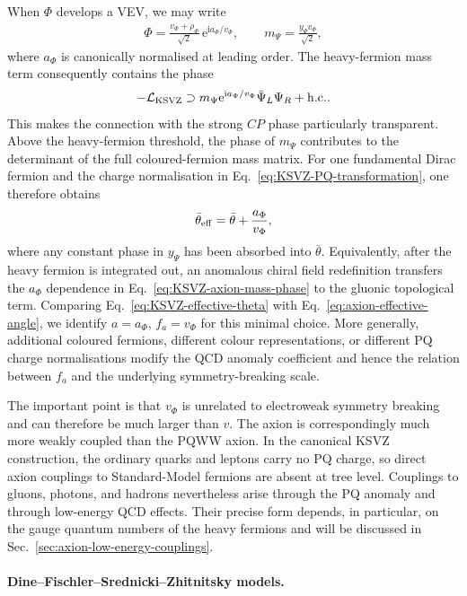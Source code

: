 \documentclass[review]{elsarticle}
\numberwithin{equation}{section}
\numberwithin{table}{section}
\numberwithin{figure}{section}
\def\i{\mathrm{i}}
\def\e{\mathrm{e}}
\def\hc{{\rm h.c.}}
\begin{document}
When $\Phi$ develops a VEV, we may write
\begin{align}
    \Phi = \frac{v_\Phi+\rho_\Phi}{\sqrt{2}}\, \e^{\i a_\Phi/v_\Phi}, \qquad
    m_\Psi = \frac{y_\Psi v_\Phi}{\sqrt{2}},
    \label{eq:KSVZ-singlet}
\end{align}
where $a_\Phi$ is canonically normalised at leading order. The heavy-fermion mass term consequently contains the phase
\begin{align}
    -\mathcal{L}_{\rm KSVZ} \supset m_\Psi \e^{\i a_\Phi/v_\Phi} \bar\Psi_L\Psi_R +\hc .
    \label{eq:KSVZ-axion-mass-phase}
\end{align}
This makes the connection with the strong $CP$ phase particularly transparent. Above the heavy-fermion threshold, the phase of $m_\Psi$ contributes to the determinant of the full coloured-fermion mass matrix. For one fundamental Dirac fermion and the charge normalisation in Eq.~\eqref{eq:KSVZ-PQ-transformation}, one therefore obtains
\begin{align}
    \bar\theta_{\rm eff} = \bar\theta + \frac{a_\Phi}{v_\Phi},
    \label{eq:KSVZ-effective-theta}
\end{align}
where any constant phase in $y_\Psi$ has been absorbed into $\bar\theta$. Equivalently, after the heavy fermion is integrated out, an anomalous chiral field redefinition transfers the $a_\Phi$ dependence in Eq.~\eqref{eq:KSVZ-axion-mass-phase} to the gluonic topological term. Comparing Eq.~\eqref{eq:KSVZ-effective-theta} with Eq.~\eqref{eq:axion-effective-angle}, we identify $a=a_\Phi$, $f_a=v_\Phi$
for this minimal choice. More generally, additional coloured fermions, different colour representations, or different PQ charge normalisations modify the QCD anomaly coefficient and hence the relation between $f_a$ and the underlying symmetry-breaking scale.

The important point is that $v_\Phi$ is unrelated to electroweak symmetry breaking and can therefore be much larger than $v$. The axion is correspondingly much more weakly coupled than the PQWW axion. In the canonical KSVZ construction, the ordinary quarks and leptons carry no PQ charge, so direct axion couplings to Standard-Model fermions are absent at tree level. Couplings to gluons, photons, and hadrons nevertheless arise through the PQ anomaly and through low-energy QCD effects. Their precise form depends, in particular, on the gauge quantum numbers of the heavy fermions and will be discussed in Sec.~\ref{sec:axion-low-energy-couplings}.

\paragraph{Dine--Fischler--Srednicki--Zhitnitsky models.}
\end{document}
